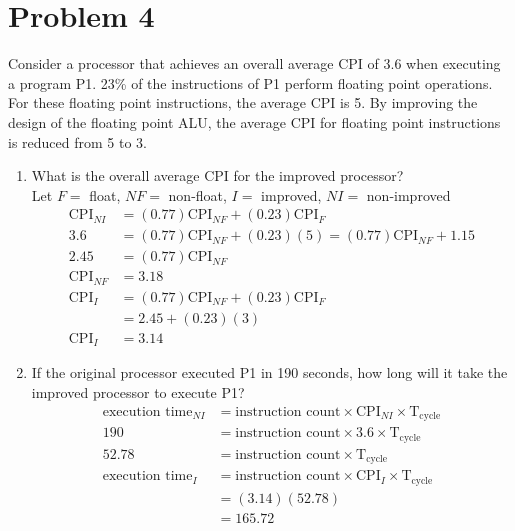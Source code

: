 \documentclass[10pt,letterpaper]{article}
\begin{document}

\section{Problem 4}
Consider a processor that achieves an overall average CPI of 3.6 when executing a program P1. 23\% of the instructions of P1 perform floating point operations. For these floating point instructions, the average CPI is 5. By improving the design of the floating point ALU, the average CPI for floating point instructions is reduced from 5 to 3.
\begin{enumerate}[label=\Alph*)]
\item What is the overall average CPI for the improved processor?\\
Let $F = $ float, $NF = $ non-float, $I = $ improved, $NI = $ non-improved
\begin{equation*}\begin{split}
\text{CPI}_{NI} & = (0.77)\text{CPI}_{NF} + (0.23)\text{CPI}_F \\
3.6 &= (0.77)\text{CPI}_{NF} + (0.23)(5) = (0.77)\text{CPI}_{NF} + 1.15 \\
2.45 & = (0.77)\text{CPI}_{NF} \\
\text{CPI}_{NF} &= 3.18 \\
\text{CPI}_I &= (0.77)\text{CPI}_{NF} + (0.23)\text{CPI}_F \\
&= 2.45 + (0.23)(3) \\
\text{CPI}_I &= \boxed{3.14}
\end{split}\end{equation*}
\item If the original processor executed P1 in 190 seconds, how long will it take the improved processor to execute P1?
\begin{equation*}\begin{split}
\text{execution time}_{NI} &= \text{instruction count} \times \text{CPI}_{NI} \times \text{T}_{\text{cycle}} \\
190 &= \text{instruction count} \times 3.6 \times \text{T}_{\text{cycle}} \\
52.78 &= \text{instruction count} \times \text{T}_{\text{cycle}} \\
\text{execution time}_{I} &= \text{instruction count} \times \text{CPI}_I \times \text{T}_{\text{cycle}} \\
&= (3.14)(52.78) \\
&= \boxed{165.72} \\
\end{split}\end{equation*}
\end{enumerate}
\pagebreak
\end{document}
